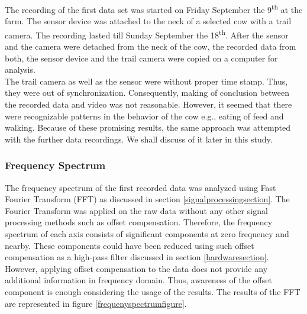 \documentclass[english,12pt,a4paper,pdftex,elec,utf8]{aaltothesis}
\begin{document}
The recording of the first data set was started on Friday September the 9\textsuperscript{th} at the farm. The sensor device was attached to the neck of a selected cow with a trail camera. The recording lasted till Sunday September the 18\textsuperscript{th}. After the sensor and the camera were detached from the neck of the cow, the recorded data from both, the sensor device and the trail camera were copied on a computer for analysis. \\

The trail camera as well as the sensor were without proper time stamp. Thus, they were out of synchronization. Consequently, making of conclusion between the recorded data and video was not reasonable. However, it seemed that there were recognizable patterns in the behavior of the cow e.g., eating of feed and walking. Because of these promising results, the same approach was attempted with the further data recordings. We shall discuss of it later in this study.
\\

\subsubsection*{Frequency Spectrum}

The frequency spectrum of the first recorded data was analyzed using Fast Fourier Transform (FFT) as discussed in section \ref{signalprocessingsection}. The Fourier Transform was applied on the raw data without any other signal processing methods such as offset compensation. Therefore, the frequency spectrum of each axis consists of significant components at zero frequency and nearby. These components could have been reduced using such offset compensation as a high-pass filter discussed in section \ref{hardwaresection}. However, applying offset compensation to the data does not provide any additional information in frequency domain. Thus, awareness of the offset component is enough considering the usage of the results. The results of the FFT are represented in figure \ref{frequenyspectrumfigure}. \\
\end{document}
